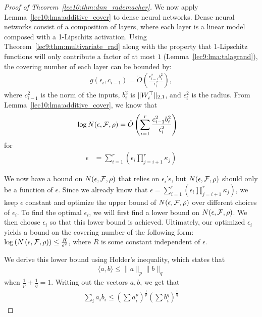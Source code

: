 \begin{proof}[Proof of Theorem~\ref{lec10:thm:dnn_rademacher}]
We now apply Lemma~\ref{lec10:lma:additive_cover} to dense neural networks. Dense neural networks consist of a composition of layers, where each layer is a linear model composed with a 1-Lipschitz activation. Using Theorem~\ref{lec9:thm:multivariate_rad} along with the property that 1-Lipschitz functions will only contribute a factor of at most $1$ (Lemma~\ref{lec9:lma:talagrand}), the covering number of each layer can be bounded by:
\begin{align}
    g\left(\epsilon_i, c_{i-1}\right) = \tilde{O}\left(\frac{c_{i-1}^2b_i^2}{\epsilon_i^2}\right),
\end{align}
where $c_{i-1}^2$ is the norm of the inputs, $b_i^2$ is $\|W_i^\top\|_{2,1}$, and $\epsilon_i^2$ is the radius. From Lemma~\ref{lec10:lma:additive_cover}, we know that 
\begin{align}
    \log N(\epsilon, \mathcal F, \rho) &= \tilde{O}\left(\sum_{i=1}^{r}\frac{c_{i-1}^2b_i^2}{\epsilon_i^2}\right) 
\end{align}
for
\begin{align}
    \epsilon &= \sum_{i=1}^{r} \left(\epsilon_i \prod_{j=i+1}^{r}\kappa_j\right)
\end{align}

We now have a bound on $N(\epsilon, \mathcal F, \rho)$ that relies on $\epsilon_i$'s, but $N(\epsilon, \mathcal F, \rho)$ should only be a function of $\epsilon$. Since we already know that $\epsilon = \sum_{i=1}^{r} \left(\epsilon_i \prod_{j=i+1}^{r}\kappa_j\right)$, we keep $\epsilon$ constant and optimize the upper bound of $N(\epsilon, \mathcal F, \rho)$ over different choices of $\epsilon_i$. To find the optimal $\epsilon_i$, we will first find a lower bound on $N(\epsilon, \mathcal F, \rho)$. We then choose $\epsilon_i$ so that this lower bound is achieved. Ultimately, our optimized $\epsilon_i$ yields a bound on the covering number of the following form: $\log\left(N\left(\epsilon, \mathcal F, \rho\right)\right) \leq \frac{R}{\epsilon^2}$, where $R$ is some constant independent of $\epsilon$. 

We derive this lower bound using Holder's inequality, which states that
\begin{align}
    \langle a,  b \rangle \leq \|a\|_p \|b\|_q
\end{align}
when $\frac{1}{p} + \frac{1}{q} = 1$. Writing out the vectors $a, b$, we get that 
\begin{align}
    \sum_{i}a_ib_i \leq \left(\sum a_i^p\right)^{\frac{1}{p}}\left(\sum b_i^q\right)^{\frac{1}{q}}
\end{align}


\end{proof}
